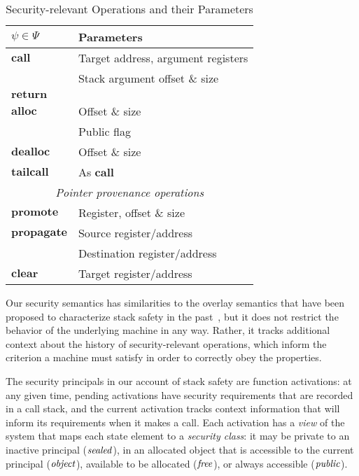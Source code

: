 \newcommand{\example}{\rowcolor{black!0}}
\newcommand{\testing}{\rowcolor{black!10}}
\newcommand{\theory}{\rowcolor{black!25}}

\begin{table}
  \begin{tabular}{| l | l |}
    \hline
    \(\psi \in \Psi\) & Parameters \\
    \hline
    \example \(\mathbf{call}\) & Target address, argument registers \\
    \testing & Stack argument offset \& size \\
    \example \(\mathbf{return}\) & \\
    \example \(\mathbf{alloc}\) & Offset \& size \\
    \testing & Public flag \\
    \example \(\mathbf{dealloc}\) & Offset \& size \\
    \testing \(\mathbf{tailcall}\) & As \(\mathbf{call}\) \\
    \hline
    \multicolumn{2}{|c|}{{\it Pointer provenance operations}} \\
    \hline
    \theory \(\mathbf{promote}\) & Register, offset \& size \\
    \theory \(\mathbf{propagate}\) & Source register/address \\
    \theory & Destination register/address \\
    \theory \(\mathbf{clear}\) & Target register/address \\
    \hline
  \end{tabular}
  \caption{Security-relevant Operations and their Parameters}
  \label{tab:psi}
\end{table}

Our security semantics has similarities to the overlay semantics that have been proposed
to characterize stack safety in the past~\cite{SkorstengaardSTK}, but it does not restrict
the behavior of the underlying machine in any way. Rather, it tracks additional context
about the history of security-relevant operations, which inform the criterion a machine
must satisfy in order to correctly obey the properties.

The security principals in our account of stack safety are function
activations: at any given time, pending activations
have security requirements that are recorded in a call stack, and the current
activation tracks context information that will inform its requirements when
it makes a call. Each activation has a {\it view}
of the system that maps each state element to a {\it security class}:
it may be private to an inactive principal (\(\mathit{sealed}\)),
in an allocated object that is accessible to the current principal (\(\mathit{object}\)),
available to be allocated (\(\mathit{free}\)), or
always accessible (\(\mathit{public}\)).

